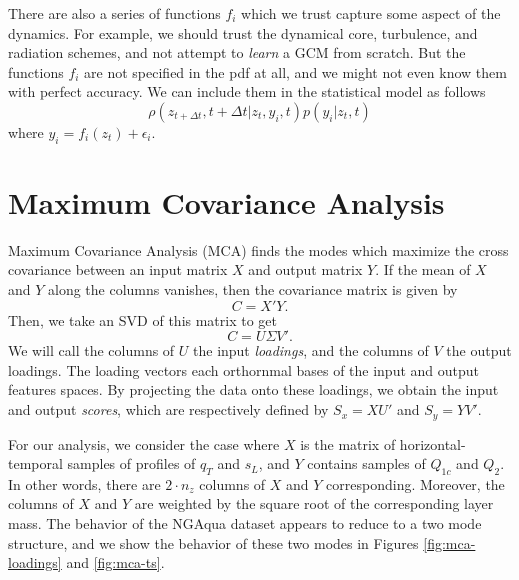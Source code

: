 \documentclass{report}
\begin{document}
There are also a series of functions $f_i$ which we trust capture some aspect of
the dynamics. 
For example, we should trust the dynamical core, turbulence, and radiation
schemes, and not attempt to \emph{learn} a GCM from scratch.
But the functions $f_i$ are not specified in the pdf at all, and we might not
even know them with perfect accuracy. We can include them in the statistical
model as follows
\[\rho(z_{t+\Delta t}, t+ \Delta t| z_t, y_i, t) p(y_i|z_t, t) \]
where $y_i = f_i(z_t) + \epsilon_i$.




\section{Maximum Covariance Analysis}
\label{sec:mca}

Maximum Covariance Analysis (MCA) finds the modes which maximize the cross
covariance between an input matrix $X$ and output matrix $Y$. 
If the mean of $X$ and $Y$ along the columns vanishes, then the covariance
matrix is given by
\[C=X'Y.\]
Then, we take an SVD of this matrix to get
\[C=U\Sigma V'.\] We will call the columns of $U$ the input \emph{loadings}, and
the columns of $V$ the output loadings. 
The loading vectors each orthornmal bases of the input and output features
spaces. 
By projecting the data onto these loadings, we obtain the input and output
\emph{scores}, which are respectively defined by $S_x = X U'$ and $S_y=YV'$. 

For our analysis, we consider the case where $X$ is the matrix of
horizontal-temporal samples of profiles of $q_T$ and $s_L$, and $Y$ contains
samples of $Q_{1c}$ and $Q_2$. In other words, there are $2\cdot n_z$ columns of
$X$ and $Y$ corresponding. Moreover, the columns of $X$ and $Y$ are weighted by
the square root of the corresponding layer mass. The behavior of the NGAqua
dataset appears to reduce to a two mode structure, and we show the behavior of
these two modes in Figures \ref{fig:mca-loadings} and \ref{fig:mca-ts}.
\end{document}
